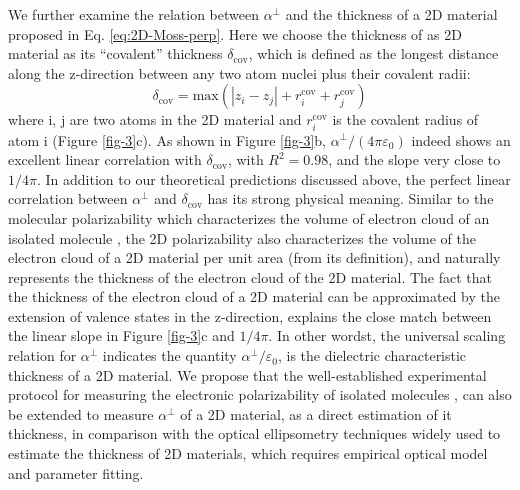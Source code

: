 \documentclass[journal=ancac3,manuscript=article,email=true,hyperref=true,keywords=false]{achemso}
\begin{document}
We further examine the relation between $\alpha^{\perp}$ and the
thickness of a 2D material proposed in Eq. \ref{eq:2D-Moss-perp}. Here
we choose the thickness of as 2D material as its ``covalent''
thickness $\delta_{\mathrm{cov}}$, which is
defined as the longest distance along the z-direction between any two
atom nuclei plus their covalent radii:
\begin{equation}
  \label{eq:cov-thick}
  \delta_{\mathrm{cov}} = \mathrm{max}(|z_{i} - z_{j}|
  + r_{i}^{\mathrm{cov}} + r_{j}^{\mathrm{cov}})
\end{equation}
where i, j are two atoms in the 2D material and $r^{\mathrm{cov}}_{i}$
is the covalent radius of atom i (Figure \ref{fig-3}c). As shown in
Figure \ref{fig-3}b, $\alpha^{\perp}/(4 \pi \varepsilon_{0})$ indeed
shows an excellent linear correlation with $\delta_{\mathrm{cov}}$,
with $R^{2}=0.98$, and the slope very close to $1/4\pi$. In addition
to our theoretical predictions discussed above, the perfect linear
correlation between $\alpha^{\perp}$ and $\delta_{\mathrm{cov}}$ has
its strong physical meaning. Similar to the molecular polarizability
which characterizes the volume of electron cloud of an isolated
molecule \cite{Israelachvili_2011}, the 2D polarizability also
characterizes the volume of the electron cloud of a 2D material per
unit area (from its definition), and naturally represents the
thickness of the electron cloud of the 2D material. The fact that the
thickness of the electron cloud of a 2D material can be approximated
by the extension of valence states in the z-direction, explains the
close match between the linear slope in Figure \ref{fig-3}c and
$1/4\pi$. In other wordst, the universal scaling relation for
$\alpha^{\perp}$ indicates the quantity
$\alpha^{\perp}/\varepsilon_{0}$, is the dielectric characteristic
thickness of a 2D material. We propose that the well-established
experimental protocol for measuring the electronic polarizability of
isolated molecules \cite{Antoine_1999}, can also be extended to
measure $\alpha^{\perp}$ of a 2D material, as a direct estimation of
it thickness, in comparison with the optical ellipsometry techniques
\cite{Weber_2010} widely used to estimate the thickness of 2D
materials, which requires empirical optical model and parameter
fitting.
\end{document}
